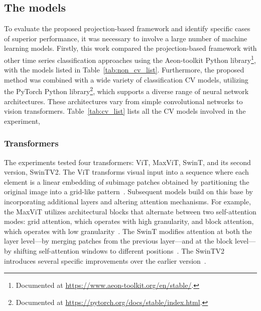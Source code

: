 \subsection{The models}

To evaluate the proposed projection-based framework and identify specific cases of superior performance, it was necessary to involve a large number of machine learning models. Firstly, this work compared the projection-based framework with other time series classification approaches using the Aeon-toolkit Python library\footnote{Documented at \url{https://www.aeon-toolkit.org/en/stable/}.}, with the models listed in Table~\ref{tab:non_cv_list}. Furthermore, the proposed method was combined with a wide variety of classification \gls{CV} models, utilizing the PyTorch Python library\footnote{Documented at \url{https://pytorch.org/docs/stable/index.html}.}, which supports a diverse range of neural network architectures. These architectures vary from simple convolutional networks to vision transformers. Table~\ref{tab:cv_list} lists all the \gls{CV} models involved in the experiment, 





\subsubsection{Transformers}

The experiments tested four transformers: \gls{ViT}, \gls{MaxViT}, \gls{SwinT}, and its second version, \gls{SwinTV2}. The \gls{ViT} transforms visual input into a sequence where each element is a linear embedding of subimage patches obtained by partitioning the original image into a grid-like pattern~\cite{VisionTransformer}. Subsequent models build on this base by incorporating additional layers and altering attention mechanisms. For example, the \gls{MaxViT} utilizes architectural blocks that alternate between two self-attention modes: grid attention, which operates with high granularity, and block attention, which operates with low granularity~\cite{MaxViT}. The \gls{SwinT} modifies attention at both the layer level—by merging patches from the previous layer—and at the block level—by shifting self-attention windows to different positions~\cite{SwinTransformer}. The \gls{SwinTV2} introduces several specific improvements over the earlier version~\cite{SwinTransformerV2}.


